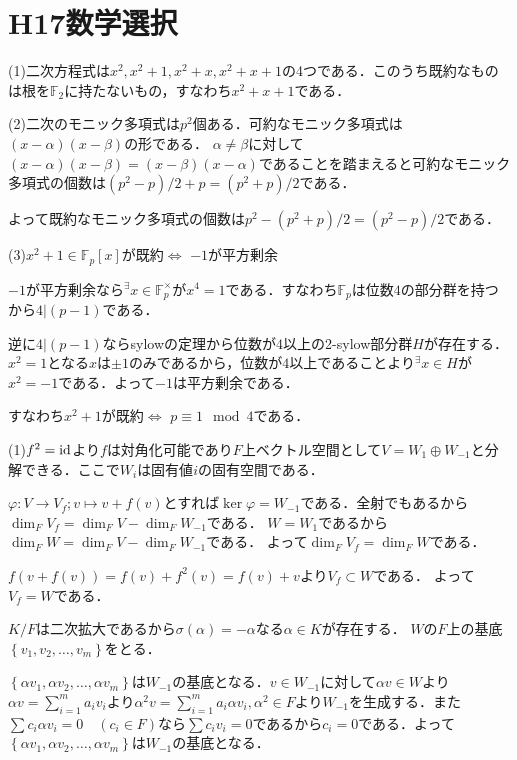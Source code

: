 \documentclass[
		book,
		head_space=20mm,
		foot_space=20mm,
		gutter=10mm,
		line_length=190mm
]{jlreq}
\begin{document}
\section{H17数学選択}
(1)二次方程式は$x^2,x^2+1,x^2+x,x^2+x+1$の4つである．このうち既約なものは根を$\mathbb{F}_2$に持たないもの，すなわち$x^2+x+1$である．

(2)二次のモニック多項式は$p^2$個ある．可約なモニック多項式は$(x-\alpha)(x-\beta)$の形である．
$\alpha\neq \beta$に対して$(x-\alpha)(x-\beta)=(x-\beta)(x-\alpha)$であることを踏まえると可約なモニック多項式の個数は$(p^2-p)/2+p=(p^2+p)/2$である．

よって既約なモニック多項式の個数は$p^2-(p^2+p)/2=(p^2-p)/2$である．

(3)$x^2+1 \in \mathbb{F}_p[x]$が既約$\Leftrightarrow$ $-1$が平方剰余

$-1$が平方剰余なら$^\exists x \in \mathbb{F}_p^\times$が$x^4=1$である．すなわち$\mathbb{F}_p$は位数$4$の部分群を持つから$4|(p-1)$である．

逆に$4|(p-1)$ならsylowの定理から位数が$4$以上の2-sylow部分群$H$が存在する．
$x^2=1$となる$x$は$\pm{1}$のみであるから，位数が$4$以上であることより$^\exists x \in H$が$x^2=-1$である．よって$-1$は平方剰余である．

すなわち$x^2+1$が既約$\Leftrightarrow$ $p \equiv 1 \mod 4$である．

(1)$f^2=\mathop{\mathrm{id}}$より$f$は対角化可能であり$F$上ベクトル空間として$V=W_1\oplus W_{-1}$と分解できる．ここで$W_i$は固有値$i$の固有空間である．

$\varphi\colon V \to V_f;v \mapsto v+f(v)$とすれば$\ker \varphi=W_{-1}$である．全射でもあるから$\dim_F V_f=\dim_F V-\dim_F W_{-1}$である．
$W=W_1$であるから$\dim_F W=\dim_F V -\dim_F W_{-1}$である．
よって$\dim_F V_f=\dim_F W$である．

$f(v+f(v))=f(v)+f^2(v)=f(v)+v$より$V_f \subset W$である．
よって$V_f=W$である．

$K/F$は二次拡大であるから$\sigma(\alpha)=-\alpha$なる$\alpha \in K$が存在する．
$W$の$F$上の基底$\left\{ v_1,v_2,\ldots,v_m \right\}$をとる．

$\left\{ \alpha v_1,\alpha v_2,\ldots,\alpha v_m \right\}$は$W_{-1}$の基底となる．$v\in W_{-1}$に対して$\alpha v\in W$より$\alpha v=\sum_{i=1}^m a_i v_i$より$\alpha^2 v =\sum_{i=1}^m a_i \alpha v_i,\alpha^2\in F$より$W_{-1}$を生成する．また$\sum c_i \alpha v_i=0\quad(c_i\in F)$なら$\sum c_i v_i=0$であるから$c_i=0$である．よって$\left\{ \alpha v_1,\alpha v_2,\ldots,\alpha v_m \right\}$は$W_{-1}$の基底となる．
\end{document}
